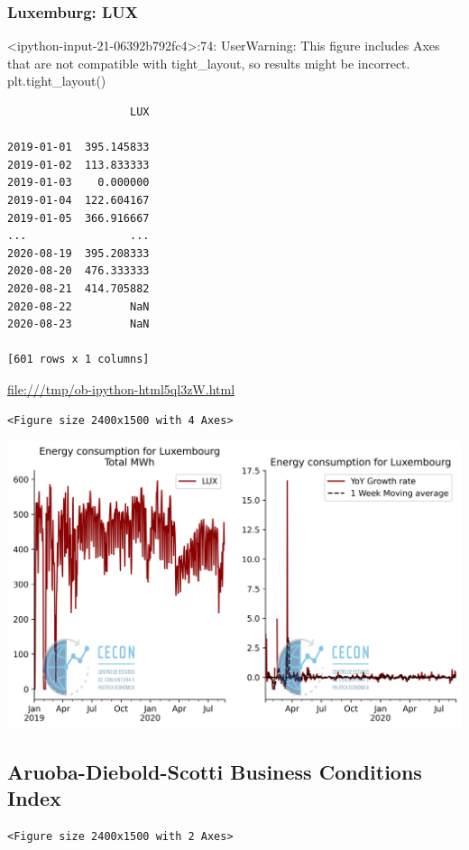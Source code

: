 \documentclass[11pt]{article}
\begin{document}
\subsubsection{Luxemburg: LUX}
\label{sec:orgcff1ec7}

<ipython-input-21-06392b792fc4>:74: UserWarning: This figure includes Axes that are not compatible with tight\_layout, so results might be incorrect.
  plt.tight\_layout()

\begin{verbatim}
                   LUX
                      
2019-01-01  395.145833
2019-01-02  113.833333
2019-01-03    0.000000
2019-01-04  122.604167
2019-01-05  366.916667
...                ...
2020-08-19  395.208333
2020-08-20  476.333333
2020-08-21  414.705882
2020-08-22         NaN
2020-08-23         NaN

[601 rows x 1 columns]
\end{verbatim}


\url{file:///tmp/ob-ipython-html5ql3zW.html}

\begin{verbatim}
<Figure size 2400x1500 with 4 Axes>
\end{verbatim}


\begin{center}
\includegraphics[width=.9\linewidth]{obipy-resources/62e383af79e91b63c7fc98dd7fb55b3c3ececcb9/9106e308f42f1f76c029539778f3952a7f562f15.png}
\end{center}


\subsection{Aruoba-Diebold-Scotti Business Conditions Index}
\label{sec:org6ef1419}

\begin{verbatim}
<Figure size 2400x1500 with 2 Axes>
\end{verbatim}
\end{document}

